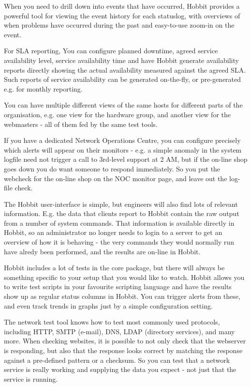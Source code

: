   When you need to drill down into events that have occurred, Hobbit
  provides a powerful tool for viewing the event history for each
  statuslog, with overviews of when problems have occurred during the
  past and easy-to-use zoom-in on the event. 

  For SLA reporting, You can configure planned downtime, agreed
  service availability level, service availability time and have
  Hobbit generate availability reports directly showing the actual
  availability measured against the agreed SLA. Such reports of
  service availability can be generated on-the-fly, or pre-generated
  e.g. for monthly reporting. 

\item[Role-based views] You can have multiple different views of the
  same hosts for different parts of the organisation, e.g. one view
  for the hardware group, and another view for the webmasters - all of
  them fed by the same test tools. 


  If you have a dedicated Network Operations Centre, you can configure
  precisely which alerts will appear on their monitors - e.g. a simple
  anomaly in the system logfile need not trigger a call to 3rd-level
  support at 2 AM, but if the on-line shop goes down you do want
  someone to respond immediately. So you put the webcheck for the
  on-line shop on the NOC monitor page, and leave out the log-file
  check. 
 

\item[Also for the techies] The Hobbit user-interface is simple, but
  engineers will also find lots of relevant information. E.g. the data
  that clients report to Hobbit contain the raw output from a number
  of system commands. That information is available directly in
  Hobbit, so an administrator no longer needs to login to a server to
  get an overview of how it is behaving - the very commands they would
  normally run have alredy been performed, and the results are on-line
  in Hobbit. 


\item[Easy to adapt to your needs] Hobbit includes a lot of tests in
  the core package, but there will always be something specific to
  your setup that you would like to watch. Hobbit allows you to write
  test scripts in your favourite scripting language and have the
  results show up as regular status columns in Hobbit. You can trigger
  alerts from these, and even track trends in graphs just by a simple
  configuration setting. 


\item[Real network service tests] The network test tool knows how to
  test most commonly used protocols, including HTTP, SMTP (e-mail),
  DNS, LDAP (directory services), and many more. When checking
  websites, it is possible to not only check that the webserver is
  responding, but also that the response looks correct by matching the
  response against a pre-defined pattern or a checksum. So you can
  test that a network service is really working and supplying the data
  you expect - not just that the service is running. 

